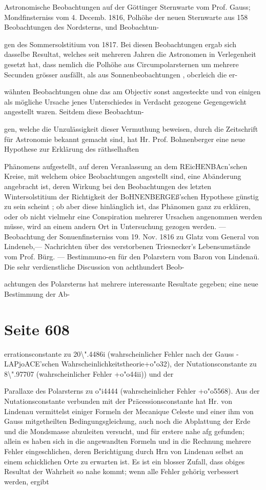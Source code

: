 \documentclass[10pt,a4paper]{article}
\begin{document}
Astronomische Beobachtungen auf der Göttinger Sternwarte vom Prof. Gauss; Mondfinsterniss vom 4. Decemb. 1816, Polhöhe der neuen Sternwarte aus 158 Beobachtungen des Nordsterns, und Beobachtun-

gen des Sommersolstitium von 1817. Bei diesen Beobachtungen ergab sich dasselbe Resultat, welches seit mehreren Jahren die Astronomen in Verlegenheit gesetzt hat, dass nemlich die Polhöhe aus Circumpolarsternen um mehrere Secunden grösser ausfällt, als aus Sonnenbeobachtungen , obcrleich die er-

wähnten Beobachtungen ohne das am Objectiv sonst angesteckte und von einigen als mögliche Ursache jenes Unterschiedes in Verdacht gezogene Gegengewicht angestellt waren. Seitdem diese Beobachtun-

gen, welche die Unzulässigkeit dieser Vermuthung beweisen, durch die Zeitschrift für Astronomie bekannt gemacht sind, hat Hr. Prof. Bohnenberger eine neue Hypothese zur Erklärung des räthselhaften

Phänomens aufgestellt, auf deren Veranlassung an dem REicHENBAcn'schen Kreise, mit welchem obice Beobachtungen angestellt sind, eine Abänderung angebracht ist, deren Wirkung bei den Beobachtungen des letzten Wintersolstitium der Richtigkeit der BoHNENBERGEß'schen Hypothese günstig zu sein scheint ; ob aber diese hinlänglich ist, das Phänomen ganz zu erklären, oder ob nicht vielmehr eine Conspiration mehrerer Ursachen angenommen werden müsse, wird an einem andern Ort in Untersuchung gezogen werden. — Beobachtung der Sonuenfinsterniss vom 19. Nov. 1816 zu Glatz vom General von Lindeneb,— Nachrichten über des verstorbenen Triesnecker's Lebensumstände vom Prof. Bürg. — Bestimmuno-en für den Polarstern vom Baron von Lindenaü. Die sehr verdienstliche Discussion von achthundert Beob-

achtungen des Polarsterns hat mehrere interessante Resultate gegeben; eine neue Bestimmung der Ab-


\newpage
\section*{Seite 608}
errationsconstante zu 20\textbackslash{}".4486i (wahrscheinlicher Fehler nach der Gauss -LAPjoACE'schen Wahrscheinlichkeitstheorie+o"o32), der Nutationsconstante zu 8\textbackslash{}".97707 (wahrscheinlicher Fehler +o"o44ii)) und der

Parallaxe des Polarsterns zu o"i4444 (wahrscheinlicher Fehler +o"o5568). Aus der Nutationsconstante verbunden mit der Präcessionsconstante hat Hr. von Lindenau vermittelst einiger Formeln der Mecanique Celeste und einer ihm von Gauss mitgetheilten Bedingungsgleichung, auch noch die Abplattung der Erde und die Mondsmasse abzuleiten versucht, und für erstere nahe afg gefunden; allein es haben sich in die angewandten Formeln und in die Rechnung mehrere Fehler eingeschlichen, deren Berichtigung durch Hrn von Lindenau selbst an einem schicklichen Orte zu erwarten ist. Es ist ein blosser Zufall, dass obiges Resultat der Wahrheit so nahe kommt; wenn alle Fehler gehörig verbessert werden, ergibt
\end{document}
